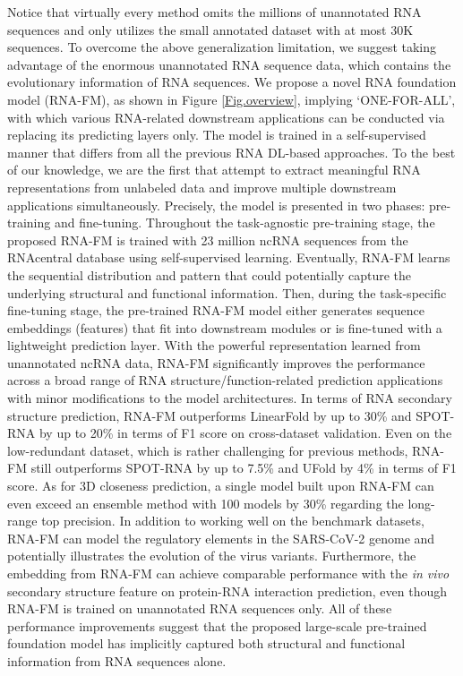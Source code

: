 Notice that virtually every method omits the millions of unannotated RNA sequences and only utilizes the small annotated dataset with at most 30K sequences. 
To overcome the above generalization limitation, we suggest taking advantage of the enormous unannotated RNA sequence data, which contains the evolutionary information of RNA sequences. We propose a novel RNA foundation model (RNA-FM), as shown in Figure \ref{Fig.overview}, implying `ONE-FOR-ALL', with which various RNA-related downstream applications can be conducted via replacing its predicting layers only. The model is trained in a self-supervised manner that differs from all the previous RNA DL-based approaches. To the best of our knowledge, we are the first that attempt to extract meaningful RNA representations from unlabeled data and improve multiple downstream applications simultaneously. Precisely, the model is presented in two phases: pre-training and fine-tuning. Throughout the task-agnostic pre-training stage, the proposed RNA-FM is trained with 23 million ncRNA sequences from the RNAcentral database using self-supervised learning. Eventually, RNA-FM learns the sequential distribution and pattern that could potentially capture the underlying structural and functional information. Then, during the task-specific fine-tuning stage, the pre-trained RNA-FM model either generates sequence embeddings (features) that fit into downstream modules or is fine-tuned with a lightweight prediction layer.
With the powerful representation learned from unannotated ncRNA data, RNA-FM significantly improves the performance across a broad range of RNA structure/function-related prediction applications with minor modifications to the model architectures. In terms of RNA secondary structure prediction, RNA-FM outperforms LinearFold by up to 30\% and SPOT-RNA by up to 20\% in terms of F1 score on cross-dataset validation. Even on the low-redundant dataset, which is rather challenging for previous methods, RNA-FM still outperforms SPOT-RNA by up to 7.5\% and UFold by 4\% in terms of F1 score. As for 3D closeness prediction, a single model built upon RNA-FM can even exceed an ensemble method with 100 models by 30\% regarding the long-range top precision.
In addition to working well on the benchmark datasets, RNA-FM can model the regulatory elements in the SARS-CoV-2 genome and potentially illustrates the evolution of the virus variants.
Furthermore, the embedding from RNA-FM can achieve comparable performance with the \textit{in vivo} secondary structure feature on protein-RNA interaction prediction, even though RNA-FM is trained on unannotated RNA sequences only. 
All of these performance improvements suggest that the proposed large-scale pre-trained foundation model has implicitly captured both structural and functional information from RNA sequences alone.



